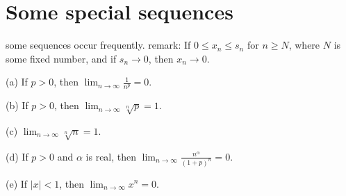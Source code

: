 \section{Some special sequences}

some sequences occur frequently.
remark: If $0\leq x_n \leq s_n$ for $n \geq N$, where $N$ is some fixed number, and if $s_n \rightarrow 0$, then $x_n \rightarrow 0$.

\begin{thm}
    \label{thm:3.20}
    (a) If $p > 0$, then $\lim_{n \to \infty} \frac{1}{n^p} = 0$. 

    (b) If $p > 0$, then $\lim_{n \to \infty} \sqrt[n]{p} = 1$.
    
    (c) $\lim_{n \to \infty} \sqrt[n]{n} = 1$.
    
    (d) If $p > 0$ and $\alpha$ is real, then $\lim_{n \to \infty} \frac{n^\alpha}{(1+p)^n} = 0$.

    (e) If $|x|<1$, then $\lim_{n \to \infty} x^n = 0$.
\end{thm}